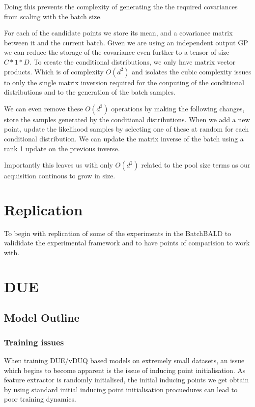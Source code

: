 \documentclass[12pt, a4paper]{report}
\theoremstyle{definition}
\begin{document}
Doing this prevents the complexity of generating the the required covariances from scaling with the batch size.

For each of the candidate points we store its mean, and a covariance matrix between it and the current batch. Given we are using an independent output GP we can reduce the storage of the covariance even further to a tensor of size $C * 1 * D$. To create the conditional distributions, we only have matrix vector products. Which is of complexity $O(d^2)$ and isolates the cubic complexity issues to only the single matrix inversion required for the conputing of the conditional distributions and to the generation of the batch samples.

We can even remove these $O(d^3)$ operations by making the following changes, store the samples generated by the conditional distributions. When we add a new point, update the likelihood samples by selecting one of these at random for each conditional distribution. We can update the matrix inverse of the batch using a rank 1 update on the previous inverse.

Importantly this leaves us with only $O(d^2)$ related to the pool size terms as our acquisition continous to grow in size.


\section{Replication}

To begin with replication of some of the experiments in the BatchBALD to valididate the experimental framework and to have points of comparision to work with.




\section{DUE}

\subsection{Model Outline}


\subsubsection{Training issues}

When training DUE/vDUQ based models on extremely small datasets, an issue which begins to become apparent is the issue of inducing point initialisation. As feature extractor is randomly initialised, the initial inducing points we get obtain by using standard initial inducing point initialisation procuedures can lead to poor training dynamics.
\end{document}
